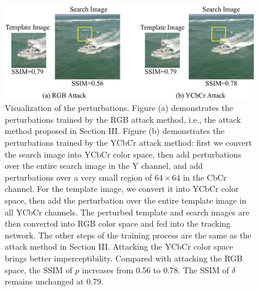 \documentclass[12pt]{article}
\begin{document}
\begin{figure}[t]
  \renewcommand\thefigure{9}
  \centering
  \includegraphics[width=.8\textwidth]{images_imperceptible/1.pdf}
  \caption{Visualization of the perturbations.
  Figure (a) demonstrates the perturbations trained by the RGB attack method, i.e., the attack method proposed in Section III.
  Figure (b) demonstrates the perturbations trained by the YCbCr attack method: first we convert the search image into YCbCr color space, then add perturbations over the entire search image in the Y channel, and add perturbations over a very small region of $64 \times 64$ in the CbCr channel. 
  For the template image, we convert it into YCbCr color space, then add the perturbation over the entire template image in all YCbCr channels.
  The perturbed template and search images are then converted into RGB color space and fed into the tracking network.
  The other steps of the training process are the same as the attack method in Section III.
  Attacking the YCbCr color space brings better imperceptibility. Compared with attacking the RGB space, the SSIM of $p$ increases from 0.56 to 0.78. The SSIM of $\delta$ remains unchanged at 0.79.}
  \label{fig:YCbCr}
\end{figure}
\end{document}
